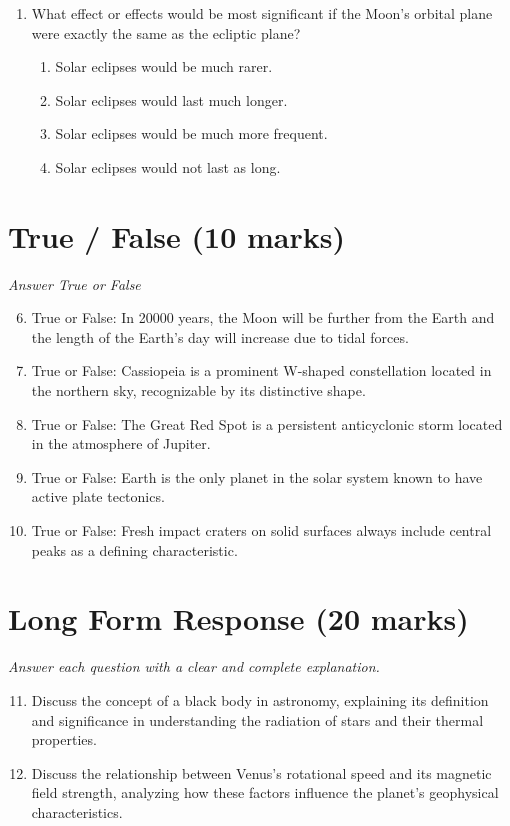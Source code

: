 \documentclass[12pt]{article}
\begin{document}
\begin{enumerate}[label=\arabic*.]
\begin{enumerate}[label=(\alph*)]
    \item They reflect enough of the sun's light to make them brighter than most background stars
    \item Asteroids have substantial motion relative to the background stars
\end{enumerate}
\item What effect or effects would be most significant if the Moon's orbital plane were exactly
the same as the ecliptic plane?
\begin{enumerate}[label=(\alph*)]
    \item Solar eclipses would be much rarer.
    \item Solar eclipses would last much longer.
    \item Solar eclipses would be much more frequent.
    \item Solar eclipses would not last as long.
\end{enumerate}
\end{enumerate}

\section*{True / False (10 marks)}
\textit{Answer True or False}
\begin{enumerate}[label=\arabic*.]
\setcounter{enumi}{5}
\item True or False: In 20000 years, the Moon will be further from the Earth and the length of the Earth's day will increase due to tidal forces.
\item True or False: Cassiopeia is a prominent W-shaped constellation located in the northern sky, recognizable by its distinctive shape.
\item True or False: The Great Red Spot is a persistent anticyclonic storm located in the atmosphere of Jupiter.
\item True or False: Earth is the only planet in the solar system known to have active plate tectonics.
\item True or False: Fresh impact craters on solid surfaces always include central peaks as a defining characteristic.
\end{enumerate}

\section*{Long Form Response (20 marks)}
\textit{Answer each question with a clear and complete explanation.}
\begin{enumerate}[label=\arabic*.]
\setcounter{enumi}{10}
\item Discuss the concept of a black body in astronomy, explaining its definition and
significance in understanding the radiation of stars and their thermal properties.
\item Discuss the relationship between Venus's rotational speed and its magnetic field strength,
analyzing how these factors influence the planet's geophysical characteristics.
\end{enumerate}
\end{document}
